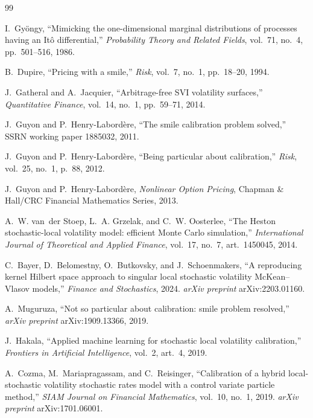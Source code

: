 \documentclass[11pt,a4paper]{article}
\theoremstyle{plain}
\theoremstyle{definition}
\theoremstyle{definition}
\begin{document}
\begin{thebibliography}{99}

 I.~Gy\"ongy, ``Mimicking the one-dimensional marginal distributions of processes having an It\^o differential,'' \textit{Probability Theory and Related Fields}, vol.~71, no.~4, pp.~501--516, 1986.

 B.~Dupire, ``Pricing with a smile,'' \textit{Risk}, vol.~7, no.~1, pp.~18--20, 1994.

 J.~Gatheral and A.~Jacquier, ``Arbitrage-free SVI volatility surfaces,'' \textit{Quantitative Finance}, vol.~14, no.~1, pp.~59--71, 2014.

 J.~Guyon and P.~Henry-Labord\`ere, ``The smile calibration problem solved,'' SSRN working paper 1885032, 2011.

 J.~Guyon and P.~Henry-Labord\`ere, ``Being particular about calibration,'' \textit{Risk}, vol.~25, no.~1, p.~88, 2012.

 J.~Guyon and P.~Henry-Labord\`ere, \textit{Nonlinear Option Pricing}, Chapman \& Hall/CRC Financial Mathematics Series, 2013.

 A.~W. van~der Stoep, L.~A. Grzelak, and C.~W. Oosterlee, ``The Heston stochastic-local volatility model: efficient Monte Carlo simulation,'' \textit{International Journal of Theoretical and Applied Finance}, vol.~17, no.~7, art.~1450045, 2014.

 C.~Bayer, D.~Belomestny, O.~Butkovsky, and J.~Schoenmakers, ``A reproducing kernel Hilbert space approach to singular local stochastic volatility McKean--Vlasov models,'' \textit{Finance and Stochastics}, 2024. \textit{arXiv preprint} arXiv:2203.01160.

 A.~Muguruza, ``Not so particular about calibration: smile problem resolved,'' \textit{arXiv preprint} arXiv:1909.13366, 2019.

 J.~Hakala, ``Applied machine learning for stochastic local volatility calibration,'' \textit{Frontiers in Artificial Intelligence}, vol.~2, art.~4, 2019.

 A.~Cozma, M.~Mariapragassam, and C.~Reisinger, ``Calibration of a hybrid local-stochastic volatility stochastic rates model with a control variate particle method,'' \textit{SIAM Journal on Financial Mathematics}, vol.~10, no.~1, 2019. \textit{arXiv preprint} arXiv:1701.06001.


\end{thebibliography}
\end{document}
